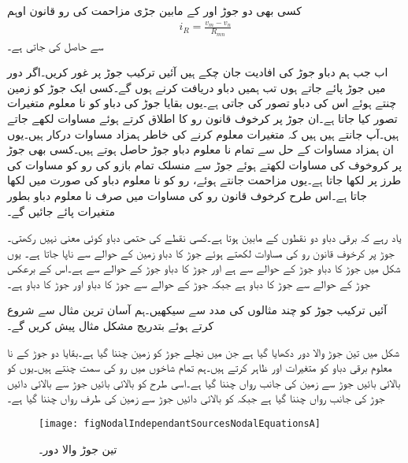 کسی بھی دو جوڑ  اور  کے مابین جڑی مزاحمت  کی رو  قانون اوہم
\begin{align}\label{مساوات-جوڑ_قانون_اوہم}
i_R=\frac{v_m-v_n}{R_{mn}}
\end{align}
سے حاصل کی جاتی ہے۔

اب جب ہم دباو جوڑ کی افادیت جان چکے ہیں آئیں ترکیب جوڑ پر غور کریں۔اگر دور میں  جوڑ پائے جاتے ہوں تب ہمیں  دباو دریافت کرنے ہوں گے۔کسی ایک جوڑ کو زمین چنتے ہوئے اس کی دباو  تصور کی جاتی ہے۔یوں بقایا  جوڑ کی دباو کو نا معلوم متغیرات تصور کیا جاتا ہے۔ان  جوڑ پر کرخوف قانون رو کا اطلاق کرتے ہوئے  مساوات لکھے جاتے ہیں۔آپ جانتے ہیں ہیں کہ  متغیرات معلوم کرنے کی خاطر  ہمزاد مساوات درکار ہیں۔یوں ان  ہمزاد مساوات کے حل سے تمام نا معلوم دباو جوڑ حاصل ہوتے ہیں۔کسی بھی جوڑ پر کروخوف کی مساوات لکھتے ہوئے جوڑ سے منسلک تمام بازو کی رو کو مساوات  کی طرز پر لکھا جاتا ہے۔یوں مزاحمت جانتے ہوئے، رو کو نا معلوم دباو کی صورت میں لکھا جاتا ہے۔اس طرح کرخوف قانون رو کی مساوات میں صرف نا معلوم دباو بطور متغیرات پائے جائیں گے۔

 یاد رہے کہ برقی دباو دو نقطوں کے مابین ہوتا ہے۔کسی نقطے کی حتمی دباو کوئی معنی نہیں رکھتی۔جوڑ پر کرخوف قانون رو کی مساوات لکھتے ہوئے جوڑ کا دباو زمین کے حوالے سے ناپا جاتا ہے۔ یوں شکل  میں جوڑ  کا دباو جوڑ  کے حوالے سے  ہے اور جوڑ  کا دباو جوڑ  کے حوالے سے  ہے۔اس کے برعکس جوڑ  کے حوالے سے جوڑ  کا دباو  ہے جبکہ جوڑ  کے حوالے سے جوڑ  کا دباو  اور جوڑ  کا دباو  ہے۔ 


آئیں ترکیب جوڑ کو چند مثالوں کی مدد سے سیکھیں۔ہم آسان ترین مثال سے شروع کرتے ہوئے بتدریج مشکل مثال پیش کریں گے۔

شکل  میں تین جوڑ والا دور دکھایا گیا ہے جن میں نچلے جوڑ کو زمین چننا گیا ہے۔بقایا دو جوڑ کے نا معلوم برقی دباو کو متغیرات  اور  ظاہر کرتے ہیں۔ہم تمام شاخوں میں رو کی سمت چنتے ہیں۔یوں  کو بالائی بائیں جوڑ سے زمین کی جانب رواں چننا گیا ہے۔اسی طرح  کو بالائی بائیں جوڑ سے بالائی دائیں جوڑ کی جانب رواں چننا گیا ہے جبکہ  کو بالائی دائیں جوڑ سے زمین کی طرف رواں چننا گیا ہے۔
\begin{figure}
\centering
\texttt{[image: figNodalIndependantSourcesNodalEquationsA]}
\caption{تین جوڑ والا دور۔}
\label{شکل_جوڑ_تین_جوڑ}
\end{figure}

